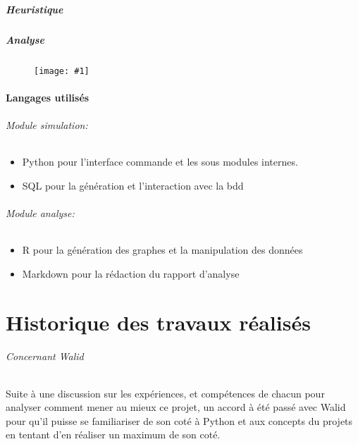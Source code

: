 \documentclass[
	headsepline=on,
	footsepline=on,
	twoside=off,
	abstract=on,
	DIV=10
]{scrreprt}
\newcommand{\img}[1]{
\begin{figure}[H]
	\centering
	\texttt{[image: \#1]}
\end{figure}
}
\begin{document}
			\subsubsection{Heuristique}
			
			\subsubsection{Analyse}
			\img{./pics/analyse_archi}
			\subsection{Langages utilisés}
			
			
				\paragraph{Module simulation:}
				\begin{itemize}
					\item Python pour l'interface commande et les sous modules internes.
					\item SQL pour la génération et l'interaction avec la bdd
				\end{itemize} 
				
				
				\paragraph{Module analyse:}
				\begin{itemize}
					\item R pour la génération des graphes et la manipulation des données
					\item Markdown pour la rédaction du rapport d'analyse
				\end{itemize}
		\part{Historique des travaux réalisés}
		
		
		\paragraph{Concernant Walid}
		
		Suite à une discussion sur les expériences, et compétences de chacun pour analyser comment mener au mieux ce projet, un accord à été passé avec Walid pour qu'il puisse se familiariser de son coté à Python et aux concepts du projets en tentant d'en réaliser un maximum de son coté.
		
\end{document}
